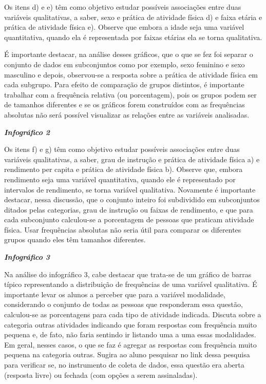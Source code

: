 \documentclass[10 pt,usenames,dvipsnames, oneside]{article}
\begin{document}
\begin{goals}
Os itens d) e e) têm como objetivo estudar possíveis associações entre duas variáveis qualitativas, a saber, sexo e prática de atividade física d) e faixa etária e prática de atividade física e). Observe que embora a idade seja uma variável quantitativa, quando ela é representada por faixas etárias ela se torna qualitativa.

É importante destacar, na análise desses gráficos, que o que se fez foi separar o conjunto de dados em subconjuntos como por exemplo, sexo feminino e sexo masculino e depois, observou-se a resposta sobre a prática de atividade física em cada subgrupo. Para efeito de comparação de grupos distintos, é importante trabalhar com a frequência relativa (ou porcentagem), pois os grupos podem ser de tamanhos diferentes e se os gráficos forem construídos com as frequências absolutas não será possível visualizar as relações entre as variáveis analisadas.

\textit{\textbf{Infográfico 2}}

Os itens f) e g) têm como objetivo estudar possíveis associações entre duas variáveis qualitativas, a saber, grau de instrução e prática de atividade física a) e rendimento per capita e prática de atividade física b). Observe que, embora rendimento seja uma variável quantitativa, quando ele é representado por intervalos de rendimento, se torna variável qualitativa. Novamente é importante destacar, nessa discussão, que o conjunto inteiro foi subdividido em subconjuntos ditados pelas categorias, grau de instrução ou faixas de rendimento, e que para cada subconjunto calculou-se a porcentagem de pessoas que praticam atividade física. Usar frequências absolutas não seria útil para comparar os diferentes grupos quando eles têm tamanhos diferentes.

\textit{\textbf{Infográfico 3}}


Na análise do infográfico 3, cabe destacar que trata-se de um gráfico de barras típico representando a distribuição de frequências de uma variável qualitativa. É importante levar os alunos a perceber que para a variável modalidade, considerando o conjunto de todas as pessoas que responderam essa questão, calculou-se as porcentagens para cada tipo de atividade indicada. Discuta sobre a categoria outras atividades indicando que foram respostas com frequência muito pequena e, de fato, não faria sentindo ir listando uma a uma essas modalidades. Em geral, nesses casos, o que se faz é agregar as respostas com frequência muito pequena na categoria outras. Sugira ao aluno pesquisar no link dessa pesquisa para verificar se, no instrumento de coleta de dados, essa questão era aberta (resposta livre) ou fechada (com opções a serem assinaladas).


\end{goals}
\end{document}
